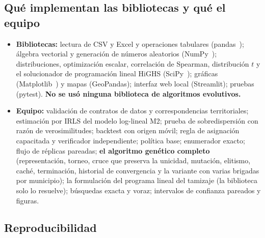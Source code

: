 \documentclass[11pt,letterpaper]{article}
\begin{document}
\subsection{Qué implementan las bibliotecas y qué el equipo}

\begin{itemize}
  \item \textbf{Bibliotecas:} lectura de CSV y Excel y operaciones tabulares (pandas~\cite{pandas}); álgebra vectorial y generación de números aleatorios (NumPy~\cite{numpy}); distribuciones, optimización escalar, correlación de Spearman, distribución $t$ y el solucionador de programación lineal HiGHS (SciPy~\cite{scipy}); gráficas (Matplotlib~\cite{matplotlib}) y mapas (GeoPandas); interfaz web local (Streamlit); pruebas (pytest). \textbf{No se usó ninguna biblioteca de algoritmos evolutivos.}
  \item \textbf{Equipo:} validación de contratos de datos y correspondencias territoriales; estimación por IRLS del modelo log-lineal M2; prueba de sobredispersión con razón de verosimilitudes; backtest con origen móvil; regla de asignación capacitada y verificador independiente; política base; enumerador exacto; flujo de réplicas pareadas; \textbf{el algoritmo genético completo} (representación, torneo, cruce que preserva la unicidad, mutación, elitismo, caché, terminación, historial de convergencia y la variante con varias brigadas por municipio); la formulación del programa lineal del tamizaje (la biblioteca solo lo resuelve); búsquedas exacta y voraz; intervalos de confianza pareados y figuras.
\end{itemize}

\subsection{Reproducibilidad}
\end{document}
